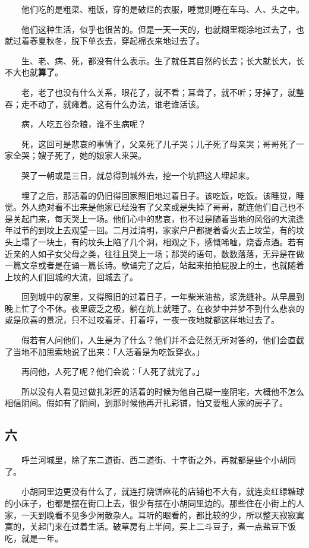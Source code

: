 \documentclass[UTF8]{ctexart}
\begin{document}
　　他们吃的是粗菜、粗饭，穿的是破烂的衣服，睡觉则睡在车马、人、头之中。

　　他们这种生活，似乎也很苦的。但是一天一天的，也就糊里糊涂地过去了，也就过着春夏秋冬，脱下单衣去，穿起棉衣来地过去了。

　　生、老、病、死，都没有什么表示。生了就任其自然的长去；长大就长大，长不大也就\textbf{算了}。

　　老，老了也没有什么关系，眼花了，就不看；耳聋了，就不听；牙掉了，就整吞；走不动了，就瘫着。这有什么办法，谁老谁活该。

　　病，人吃五谷杂粮，谁不生病呢？

　　死，这回可是悲哀的事情了，父亲死了儿子哭；儿子死了母亲哭；哥哥死了一家全哭；嫂子死了，她的娘家人来哭。

　　哭了一朝或是三日，就总得到城外去，挖一个坑把这人埋起来。

　　埋了之后，那活着的仍旧得回家照旧地过着日子。该吃饭，吃饭。该睡觉，睡觉。外人绝对看不出来是他家已经没有了父亲或是失掉了哥哥，就连他们自己也不是关起门来，每天哭上一场。他们心中的悲哀，也不过是随着当地的风俗的大流逢年过节的到坟上去观望一回。二月过清明，家家户户都提着香火去上坟茔，有的坟头上塌了一块土，有的坟头上陷了几个洞，相观之下，感慨唏嘘，烧香点酒。若有近亲的人如子女父母之类，往往且哭上一场；那哭的语句，数数落落，无异是在做一篇文章或者是在诵一篇长诗。歌诵完了之后，站起来拍拍屁股上的土，也就随着上坟的人们回城的大流，回城去了。

　　回到城中的家里，又得照旧的过着日子，一年柴米油盐，浆洗缝补。从早晨到晚上忙了个不休。夜里疲乏之极，躺在炕上就睡了。在夜梦中并梦不到什么悲哀的或是欣喜的景况，只不过咬着牙、打着哼，一夜一夜地就都这样地过去了。

　　假若有人问他们，人生是为了什么？他们并不会茫然无所对答的，他们会直截了当地不加思索地说了出来：「人活着是为吃饭穿衣。」

　　再问他，人死了呢？他们会说：「人死了就完了。」

　　所以没有人看见过做扎彩匠的活着的时候为他自己糊一座阴宅，大概他不怎么相信阴间。假如有了阴间，到那时候他再开扎彩铺，怕又要租人家的房子了。

\subsection{六}

　　呼兰河城里，除了东二道街、西二道街、十字街之外，再就都是些个小胡同了。

　　小胡同里边更没有什么了，就连打烧饼麻花的店铺也不大有，就连卖红绿糖球的小床子，也都是摆在街口上去，很少有摆在小胡同里边的。那些住在小街上的人家，一天到晚看不见多少闲散杂人。耳听的眼看的，都比较的少，所以整天寂寂寞寞的，关起门来在过着生活。破草房有上半间，买上二斗豆子，煮一点盐豆下饭吃，就是一年。
\end{document}
